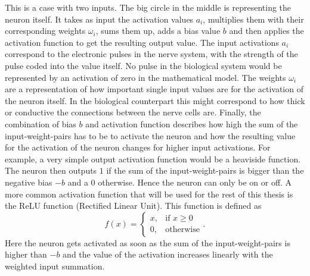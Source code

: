 This is a case with two inputs. The big circle in the middle is representing the neuron itself. It takes as input the activation values $a_i$, multiplies them with their corresponding weights $\omega_i$, sums them up, adds a bias value $b$ and then applies the activation function to get the resulting output value. The input activations $a_i$ correspond to the electronic pulses in the nerve system, with the strength of the pulse coded into the value itself. No pulse in the biological system would be represented by an activation of zero in the mathematical model. The weights $\omega_i$ are a representation of how important single input values are for the activation of the neuron itself. In the biological counterpart this might correspond to how thick or conductive the connections between the nerve cells are. Finally, the combination of bias $b$ and activation function describes how high the sum of the input-weight-pairs has to be to activate the neuron and how the resulting value for the activation of the neuron changes for higher input activations. For example, a very simple output activation function would be a heaviside function. The neuron then outputs $1$ if the sum of the input-weight-pairs is bigger than the negative bias $-b$ and a 0 otherwise. Hence the neuron can only be on or off. A more common activation function that will be used for the rest of this thesis is the ReLU function (Rectified Linear Unit). This function is defined as 
\begin{equation}
	f(x) = 
	\begin{cases}
		x, &\text{if } x\geq0 \\
		0, &\text{otherwise}
	\end{cases}.
\end{equation}
Here the neuron gets activated as soon as the sum of the input-weight-pairs is higher than $-b$ and the value of the activation increases linearly with the weighted input summation.
